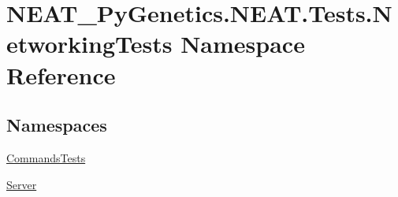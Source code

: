 \hypertarget{namespaceNEAT__PyGenetics_1_1NEAT_1_1Tests_1_1NetworkingTests}{}\section{N\+E\+A\+T\+\_\+\+Py\+Genetics.\+N\+E\+A\+T.\+Tests.\+Networking\+Tests Namespace Reference}
\label{namespaceNEAT__PyGenetics_1_1NEAT_1_1Tests_1_1NetworkingTests}
\subsection*{Namespaces}
\begin{DoxyCompactItemize}
\item 
 \hyperlink{namespaceNEAT__PyGenetics_1_1NEAT_1_1Tests_1_1NetworkingTests_1_1CommandsTests}{Commands\+Tests}
\item 
 \hyperlink{namespaceNEAT__PyGenetics_1_1NEAT_1_1Tests_1_1NetworkingTests_1_1Server}{Server}
\end{DoxyCompactItemize}
